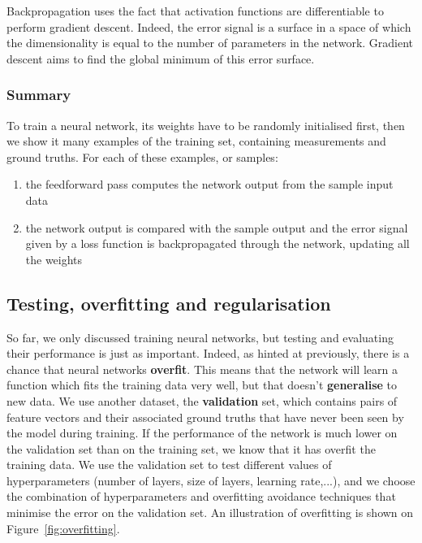 Backpropagation uses the fact that activation functions are differentiable to
perform gradient descent. Indeed, the error signal is a surface in a space
of which the dimensionality is equal to the number of parameters in the
network. Gradient descent aims to find the global minimum of this error
surface.\\


\subsubsection{Summary}
To train a neural network, its weights have to be randomly initialised first,
then we show it many examples of the training set, containing measurements and
ground truths. For each of these examples, or samples:
\begin{enumerate}
	\item the feedforward pass computes the network output from the sample
		input data
	\item the network output is compared with the sample output and the
		error signal given by a loss function
		is backpropagated through the network, updating
		all the weights
\end{enumerate}

\subsection{Testing, overfitting and regularisation}
\label{sec:regularisation}
So far, we only discussed training neural networks, but testing and
evaluating their performance is just as important. Indeed, as hinted at
previously, there is a chance that neural networks \textbf{overfit}. This
means that the network will learn a function which fits the training data
very well, but that doesn't \textbf{generalise} to new data. We use
another dataset, the \textbf{validation} set, which contains pairs of feature
vectors and their associated ground truths that have never been seen by the
model during training. If the performance of the network is much lower on
the validation set than on the training set, we know that it has overfit
the training data. We use the validation set to test different 
values of hyperparameters (number of layers, size of layers, learning rate,...),
and we choose the combination of hyperparameters and overfitting avoidance
techniques that minimise the error on the validation set. An illustration
of overfitting is shown on Figure~\ref{fig:overfitting}.\\


